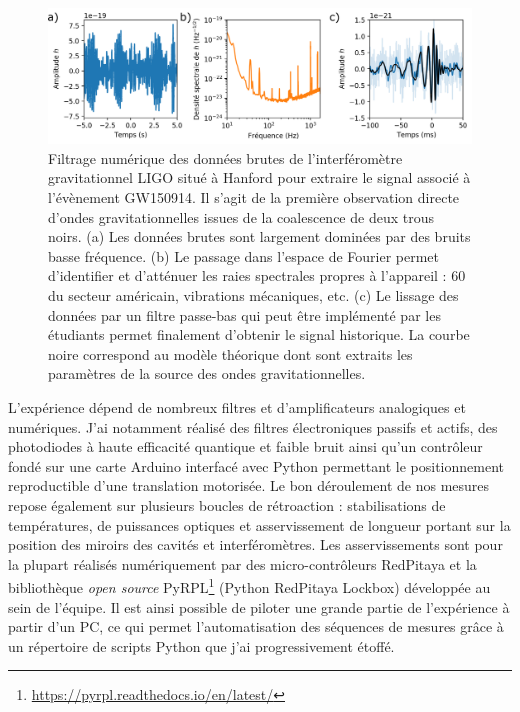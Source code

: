 \documentclass[12pt,a4paper]{article}
\begin{document}
\begin{figure}
\center
\includegraphics[scale=0.75]{figures/GW150914_data_abc_small.png}
\caption{Filtrage numérique des données brutes de l'interféromètre gravitationnel LIGO situé à Hanford pour extraire le signal associé à l'évènement GW150914.
Il s'agit de la première observation directe d'ondes gravitationnelles issues de la coalescence de deux trous noirs.
(a) Les données brutes sont largement dominées par des bruits basse fréquence.
(b) Le passage dans l'espace de Fourier permet d'identifier et d'atténuer les raies spectrales propres à l'appareil : \unit{60}{\hertz} du secteur américain, vibrations mécaniques, etc.
(c) Le lissage des données par un filtre passe-bas qui peut être implémenté par les étudiants permet finalement d'obtenir le signal historique.
La courbe noire correspond au modèle théorique dont sont extraits les paramètres de la source des ondes gravitationnelles.}
\label{fig:GW150914}
\end{figure}

L'expérience dépend de nombreux filtres et d'amplificateurs analogiques et numériques.
J'ai notamment réalisé des filtres électroniques passifs et actifs, des photodiodes à haute efficacité quantique et faible bruit ainsi qu'un contrôleur fondé sur une carte Arduino interfacé avec Python permettant le positionnement reproductible d'une translation motorisée.
Le bon déroulement de nos mesures repose également sur plusieurs boucles de rétroaction : stabilisations de températures, de puissances optiques et asservissement de longueur portant sur la position des miroirs des cavités et interféromètres.
Les asservissements sont pour la plupart réalisés numériquement par des micro-contrôleurs RedPitaya et la bibliothèque \textit{open source} PyRPL\footnote{\url{https://pyrpl.readthedocs.io/en/latest/}} (Python RedPitaya Lockbox) développée au sein de l'équipe.
Il est ainsi possible de piloter une grande partie de l'expérience à partir d'un PC, ce qui permet l'automatisation des séquences de mesures grâce à un répertoire de scripts Python que j'ai progressivement étoffé.
\end{document}
